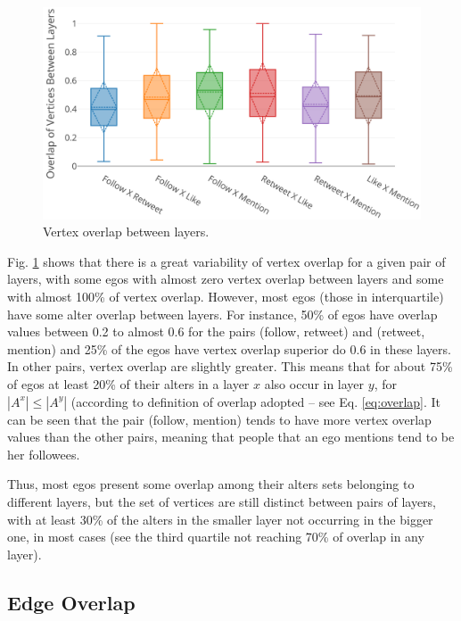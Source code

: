 \begin{figure}[h!tb]
    \centering
    \includegraphics[width=1\textwidth]{fig/net_struct/overlap/overlap_vertices_boxplot.png}
    \caption{Vertex overlap between layers.}
    \label{fig:net_struct_overlap_vertices_boxplot}
\end{figure}

Fig. \ref{fig:net_struct_overlap_vertices_boxplot} shows that there is a great variability of vertex overlap for a given pair of layers, with some egos with almost zero vertex overlap between layers and some with almost 100\% of vertex overlap. However, most egos (those in interquartile)  have some alter overlap between layers. For instance, 50\% of egos have overlap values between 0.2 to almost 0.6 for the pairs (follow, retweet) and (retweet, mention) and 25\% of the egos have vertex overlap superior do 0.6 in these layers. In other pairs, vertex overlap are slightly greater. This means that for about 75\% of egos at least 20\% of their alters in a layer $x$ also occur in layer $y$, for $|A^x| \leq |A^y|$ (according to definition of overlap adopted -- see Eq. \ref{eq:overlap}. It can be seen that the pair (follow, mention) tends to have more vertex overlap values than the other pairs, meaning that people that an ego mentions tend to be her followees. 

Thus, most egos present some overlap among their alters sets belonging to different layers, but the set of vertices are still distinct between pairs of layers, with at least 30\% of the alters in the smaller layer not occurring in the bigger one, in most cases (see the third quartile not reaching 70\% of overlap in any layer). 


\subsection*{Edge Overlap}
\label{subsec:edge_overlap}

